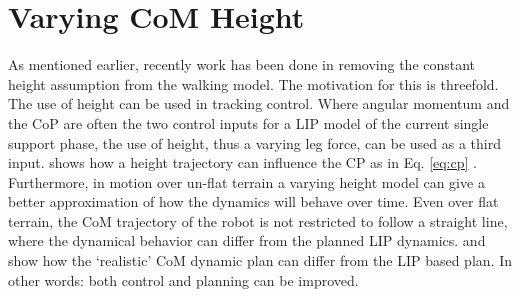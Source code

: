 %
\chapter{Varying CoM Height}%
\label{chap:varyingheight}
As mentioned earlier, recently work has been done in removing the constant height assumption from the walking model. The motivation for this is threefold. The use of height can be used in tracking control. Where angular momentum and the \ac{CoP} are often the two control inputs for a \ac{LIP} model of the current single support phase, the use of height, thus a varying leg force, can be used as a third input.  shows how a height trajectory can influence the \ac{CP} as in Eq. \eqref{eq:cp} . Furthermore, in motion over un-flat terrain a varying height model can give a better approximation of how the dynamics will behave over time. Even over flat terrain, the \ac{CoM} trajectory of the robot is not restricted to follow a straight line, where the dynamical behavior can differ from the planned \ac{LIP} dynamics.  and  show how the `realistic' \ac{CoM} dynamic plan can differ from the \ac{LIP} based plan. In other words: both control and planning can be improved. 
